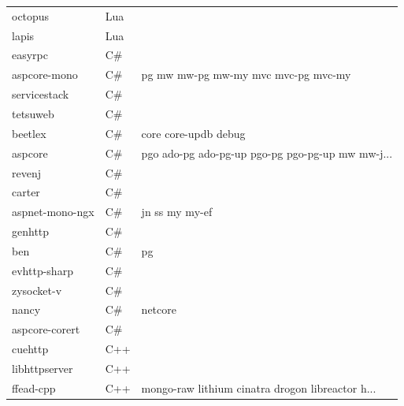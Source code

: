 \begin{longtable}{lll}
    octopus          & Lua         &                                                    \\
    lapis            & Lua         &                                                    \\
    easyrpc          & C\#         &                                                    \\
    aspcore-mono     & C\#         & pg mw mw-pg mw-my mvc mvc-pg mvc-my                \\
    servicestack     & C\#         &                                                    \\
    tetsuweb         & C\#         &                                                    \\
    beetlex          & C\#         & core core-updb debug                               \\
    aspcore          & C\#         & pgo ado-pg ado-pg-up pgo-pg pgo-pg-up mw mw-j...   \\
    revenj           & C\#         &                                                    \\
    carter           & C\#         &                                                    \\
    aspnet-mono-ngx  & C\#         & jn ss my my-ef                                     \\
    genhttp          & C\#         &                                                    \\
    ben              & C\#         & pg                                                 \\
    evhttp-sharp     & C\#         &                                                    \\
    zysocket-v       & C\#         &                                                    \\
    nancy            & C\#         & netcore                                            \\
    aspcore-corert   & C\#         &                                                    \\
    cuehttp          & C++         &                                                    \\
    libhttpserver    & C++         &                                                    \\
    ffead-cpp        & C++         & mongo-raw lithium cinatra drogon libreactor h...   \\

\end{longtable}
